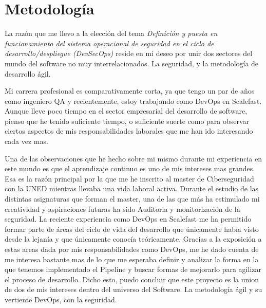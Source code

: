 \documentclass[12pt]{report} %
\begin{document}
	














\clearpage
{} %


\chapter{Metodología}


La razón que me llevo a la elección del tema \textit{Definición y puesta en 
funcionamiento del sistema operacional de seguridad en el ciclo de 
desarrollo/despliegue (DevSecOps)} reside en mi deseo por unir dos sectores del 
mundo del software no muy interrelacionados.
La seguridad, y la metodología de desarrollo ágil.

Mi carrera profesional es comparativamente corta, ya que tengo un par de años
como ingeniero QA y recientemente, estoy trabajando como DevOps en Scalefast. 
Aunque lleve poco tiempo en el sector empresarial del desarrollo de software,
pienso que he tenido suficiente tiempo, o suficiente suerte como para observar
ciertos aspectos de mis responsabilidades laborales que me han ido interesando
cada vez mas.

Una de las observaciones que he hecho sobre mi mismo durante mi experiencia en
este mundo es que el aprendizaje continuo es uno de mis intereses mas grandes.
Esa es la razón principal por la que me he inscrito al master de Ciberseguridad
con la UNED mientras llevaba una vida laboral activa.  Durante el estudio de 
las distintas asignaturas que forman el master, una de las que más ha 
estimulado mi creatividad y aspiraciones futuras ha sido Auditoria y
monitorización de la seguridad. %
La reciente experiencia como DevOps en Scalefast me ha permitido formar parte 
de áreas del ciclo de vida del desarrollo que únicamente había visto desde la
lejanía y que únicamente conocía teóricamente.
Gracias a la exposición a estas areas dada por mis responsabilidades como
DevOps, me he dado cuenta de me interesa bastante mas de lo que me esperaba
definir y analizar la forma en la que tenemos implementado el Pipeline y buscar
formas de mejorarlo para agilizar el proceso de desarrollo.
Dicho esto, puedo concluir que este proyecto es la union de dos de mis 
intereses dentro del universo del Software. 
La metodología ágil y su vertiente DevOps, con la seguridad.
\end{document}
